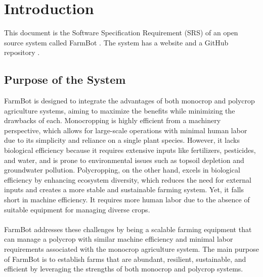 
\chapter{Introduction} \label{introduction}
This document is the Software Specification Requirement (SRS) of an open source system called FarmBot \cite{FarmBotWhitepaper}. The system has a website \cite{FarmBotWebsite} and a GitHub repository \cite{FarmBotGitHub}.

\section{Purpose of the System }
FarmBot is designed to integrate the advantages of both monocrop and polycrop agriculture systems, aiming to maximize the benefits while minimizing the drawbacks of each. Monocropping is highly efficient from a machinery perspective, which allows for large-scale operations with minimal human labor due to its simplicity and reliance on a single plant species. However, it lacks biological efficiency because it requires extensive inputs like fertilizers, pesticides, and water, and is prone to environmental issues such as topsoil depletion and groundwater pollution. Polycropping, on the other hand, excels in biological efficiency by enhancing ecosystem diversity, which reduces the need for external inputs and creates a more stable and sustainable farming system. Yet, it falls short in machine efficiency. It requires more human labor due to the absence of suitable equipment for managing diverse crops.\\\\
FarmBot addresses these challenges by being a scalable farming equipment that can manage a polycrop with similar machine efficiency and minimal labor requirements associated with the monocrop agriculture system. The main purpose of FarmBot is to establish farms that are abundant, resilient, sustainable, and efficient by leveraging the strengths of both monocrop and polycrop systems.
